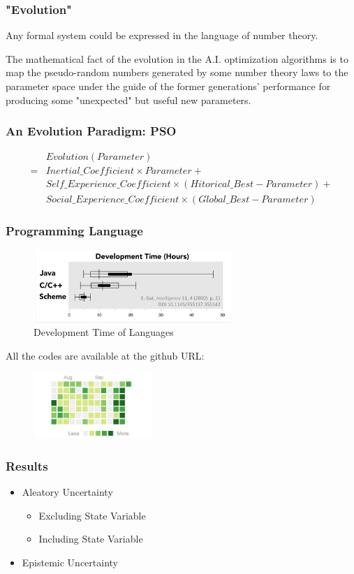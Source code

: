 \documentclass{beamer}
\begin{document}
\begin{frame}
\frametitle{"Evolution"}
Any formal system could be expressed in the language of number theory. 

The mathematical fact of the evolution in the A.I. optimization algorithms is to map the pseudo-random numbers generated by some number theory laws to the parameter space under the guide of the former generations' performance for producing some "unexpected" but useful new parameters.
\end{frame}

\begin{frame}
\frametitle{An Evolution Paradigm: PSO}
\begin{equation*}
\begin{aligned}
&Evolution(Parameter)\\=&Inertial\_Coefficient \times Parameter+\\&Self\_Experience\_Coefficient \times (Hitorical\_Best-Parameter)+\\&Social\_Experience\_Coefficient \times (Global\_Best-Parameter)
\end{aligned}
\end{equation*}
\end{frame}


\begin{frame}
\frametitle{Programming Language}
\begin{figure}[htbp]
\centering
\includegraphics[width=7.5cm]{1.png}
\caption{Development Time of Languages} \label{fig:graph}
\end{figure}
All the codes are available at the github URL: 
\begin{figure}[htbp]
\centering
\includegraphics[width=4.5cm]{2.png}
\end{figure}
\end{frame}


\begin{frame}
\frametitle{Results}
\begin{itemize}
\item Aleatory Uncertainty
\begin{itemize}
\item Excluding State Variable
\item Including State Variable 
\end{itemize}
\item Epistemic Uncertainty
\end{itemize}
\end{frame}
\end{document}
